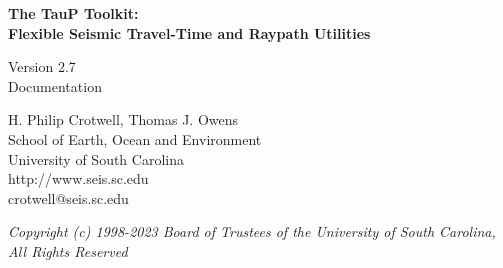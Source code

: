 
\begin{titlepage}
\begin{center}

\vspace{2in}

\LARGE
\textbf{
The TauP Toolkit: \\
Flexible Seismic Travel-Time and Raypath Utilities \\
}

\large
Version 2.7 \\
Documentation

\vspace{3in}

H. Philip Crotwell, Thomas J. Owens \\
School of Earth, Ocean and Environment \\
University of South Carolina \\
http://www.seis.sc.edu \\
crotwell@seis.sc.edu

\vspace{3in}

\textit{
\normalsize
Copyright (c) 1998-2023 Board of Trustees of the University of South Carolina, \\
All Rights Reserved
\normalsize}

\end{center}
\end{titlepage}
